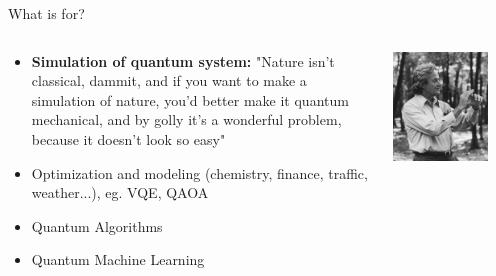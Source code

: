 \documentclass[aspectratio=169,10pt]{beamer}
\begin{document}
\begin{frame}{What is for?}
  \begin{columns}
    \begin{column}{0.5\textwidth}
      \begin{itemize}[label=\textbullet]
        \item \textbf{Simulation of quantum system:} "Nature isn't classical, dammit, and if you want to make a simulation of nature, you'd better make it quantum mechanical, and by golly it's a wonderful problem, because it doesn't look so easy"
        \item Optimization and modeling (chemistry, finance, traffic, weather...), eg. VQE, QAOA
        \item Quantum Algorithms 
        \item Quantum Machine Learning
      \end{itemize}
      \end{column}
      \begin{column}{0.5\textwidth}
        \begin{center}
            \includegraphics[width=0.8\textwidth]{figures/feynmann.jpg}
        \end{center}
      \end{column}
  \end{columns}
\end{frame}
\end{document}
